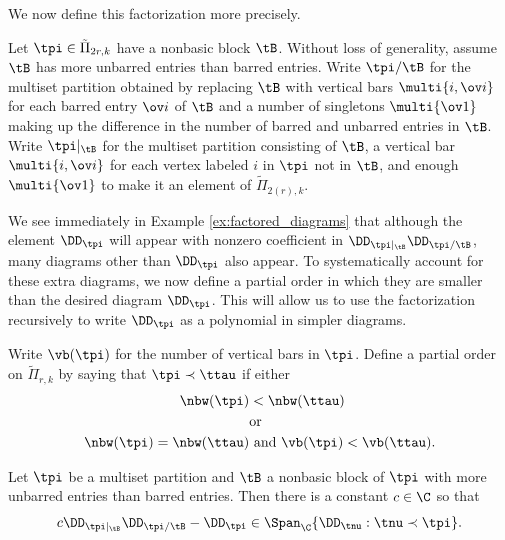 We now define this factorization more precisely.

\begin{defi}
    Let $\tpi\in\tilde{\Pi}_{2r,k}$ have a nonbasic block $\tB$. Without loss of generality, assume $\tB$ has more unbarred entries than barred entries. Write $\tpi/\tB$ for the multiset partition obtained by replacing $\tB$ with vertical bars $\multi{i,\ov i}$ for each barred entry $\ov i$ of $\tB$ and a number of singletons $\multi{\ov 1}$ making up the difference in the number of barred and unbarred entries in $\tB$. Write $\tpi|_{\tB}$ for the multiset partition consisting of $\tB$, a vertical bar $\multi{i,\ov i}$ for each vertex labeled $i$ in $\tpi$ not in $\tB$, and enough $\multi{\ov1}$ to make it an element of $\tilde\Pi_{2(r),k}$.
\end{defi}

 We see immediately in Example \ref{ex:factored_diagrams} that although the element $\DD_\tpi$ will appear with nonzero coefficient in $\DD_{\tpi|_{\tB}}\DD_{\tpi/\tB}$, many diagrams other than $\DD_\tpi$ also appear. To systematically account for these extra diagrams, we now define a partial order in which they are smaller than the desired diagram $\DD_\tpi$. This will allow us to use the factorization recursively to write $\DD_\tpi$ as a polynomial in simpler diagrams.

 Write $\vb(\tpi)$ for the number of vertical bars in $\tpi$. Define a partial order on $\tilde{\Pi}_{r,k}$ by saying that $\tpi\prec\ttau$ if either \begin{align*}
    \nbw(\tpi)&<\nbw(\ttau)\\
    &\text{or}\\
    \nbw(\tpi)=\nbw(\ttau)&\text{ and }\vb(\tpi)<\vb(\ttau).
\end{align*}

\begin{lemma}\label{lem:factorize}
    Let $\tpi$ be a multiset partition and $\tB$ a nonbasic block of $\tpi$ with more unbarred entries than barred entries. Then there is a constant $c\in\C$ so that \[c\DD_{\tpi|_{\tB}}\DD_{\tpi/\tB}-\DD_\tpi\in\Span_\C\{\DD_\tnu:\tnu\prec\tpi\}.\]
\end{lemma}

